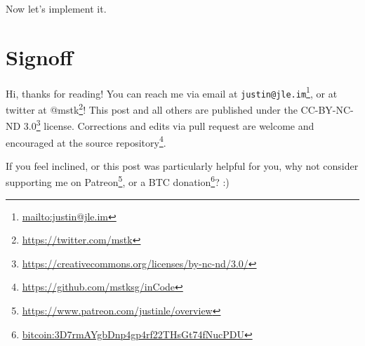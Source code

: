 \documentclass[]{article}
\renewcommand{\href}[2]{#2\footnote{\url{#1}}}
\begin{document}
Now let's implement it.

\hypertarget{signoff}{%
\section{Signoff}\label{signoff}}

Hi, thanks for reading! You can reach me via email at
\href{mailto:justin@jle.im}{\nolinkurl{justin@jle.im}}, or at twitter at
\href{https://twitter.com/mstk}{@mstk}! This post and all others are published
under the \href{https://creativecommons.org/licenses/by-nc-nd/3.0/}{CC-BY-NC-ND
3.0} license. Corrections and edits via pull request are welcome and encouraged
at \href{https://github.com/mstksg/inCode}{the source repository}.

If you feel inclined, or this post was particularly helpful for you, why not
consider \href{https://www.patreon.com/justinle/overview}{supporting me on
Patreon}, or a \href{bitcoin:3D7rmAYgbDnp4gp4rf22THsGt74fNucPDU}{BTC donation}?
:)
\end{document}
